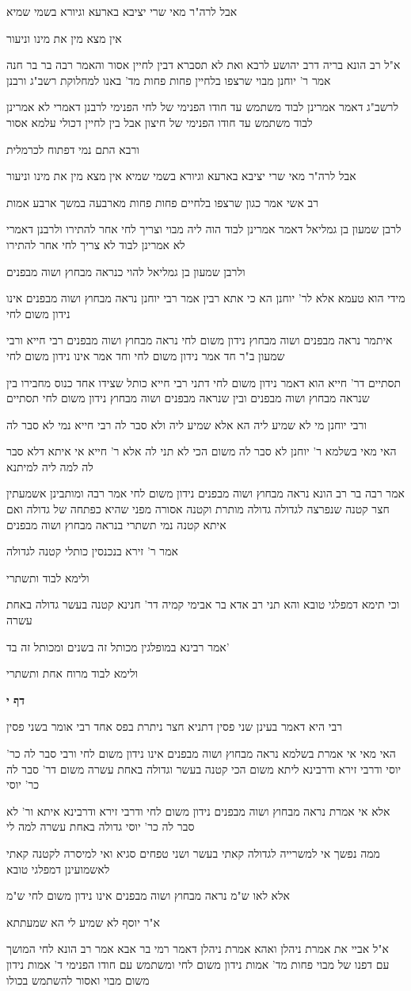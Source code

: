 \documentclass[12pt, openany]{book}
\newcommand{\sethebfont}{
\fontsize{10.5pt}{21.0pt} \selectfont
}
\newcommand{\textblock}[1]{
{\sethebfont #1\\}	
}
\newcommand{\sectname}{}
\newcommand{\newsection}[1]{
	\addcontentsline{toc}{section}{#1}
	\renewcommand{\sectname}{#1}	
	\vspace{-\baselineskip}
	\begin{center}
		\textbf{%
\fontsize{16pt}{16pt}\selectfont
			#1}
	\end{center}
	\vspace{-\baselineskip}
	\nopagebreak
}
\begin{document}
\textblock{אבל לרה"ר מאי שרי יציבא בארעא וגיורא בשמי שמיא}
\textblock{אין מצא מין את מינו וניעור}
\textblock{א"ל רב הונא בריה דרב יהושע לרבא ואת לא תסברא דבין לחיין אסור והאמר רבה בר בר חנה אמר ר' יוחנן מבוי שרצפו בלחיין פחות פחות מד'  באנו למחלוקת רשב"ג ורבנן}
\textblock{לרשב"ג דאמר אמרינן לבוד משתמש עד חודו הפנימי של לחי הפנימי לרבנן דאמרי לא אמרינן לבוד משתמש עד חודו הפנימי של חיצון אבל בין לחיין דכולי עלמא אסור}
\textblock{ורבא התם נמי דפתוח לכרמלית}
\textblock{אבל לרה"ר מאי שרי יציבא בארעא וגיורא בשמי שמיא אין מצא מין את מינו וניעור}
\textblock{רב אשי אמר כגון שרצפו בלחיים פחות פחות מארבעה במשך ארבע אמות}
\textblock{לרבן שמעון בן גמליאל דאמר אמרינן לבוד הוה ליה מבוי וצריך לחי אחר להתירו ולרבנן דאמרי לא אמרינן לבוד לא צריך לחי אחר להתירו}
\textblock{ולרבן שמעון בן גמליאל להוי כנראה מבחוץ ושוה מבפנים}
\textblock{מידי הוא טעמא אלא לר' יוחנן הא כי אתא רבין אמר רבי יוחנן נראה מבחוץ ושוה מבפנים אינו נידון משום לחי}
\textblock{איתמר נראה מבפנים ושוה מבחוץ נידון משום לחי נראה מבחוץ ושוה מבפנים רבי חייא ורבי שמעון ב"ר חד אמר נידון משום לחי וחד אמר אינו נידון משום לחי}
\textblock{תסתיים דר' חייא הוא דאמר נידון משום לחי דתני רבי חייא כותל שצידו אחד כנוס מחבירו בין שנראה מבחוץ ושוה מבפנים ובין שנראה מבפנים ושוה מבחוץ נידון משום לחי תסתיים}
\textblock{ורבי יוחנן מי לא שמיע ליה הא אלא שמיע ליה ולא סבר לה רבי חייא נמי לא סבר לה}
\textblock{האי מאי בשלמא ר' יוחנן לא סבר לה משום הכי לא תני לה אלא ר' חייא אי איתא דלא סבר לה למה ליה למיתנא}
\textblock{אמר רבה בר רב הונא נראה מבחוץ ושוה מבפנים נידון משום לחי אמר רבה ומותבינן אשמעתין חצר קטנה שנפרצה לגדולה גדולה מותרת וקטנה אסורה מפני שהיא כפתחה של גדולה ואם איתא קטנה נמי תשתרי בנראה מבחוץ ושוה מבפנים}
\textblock{אמר ר' זירא בנכנסין כותלי קטנה לגדולה}
\textblock{ולימא לבוד ותשתרי}
\textblock{וכי תימא דמפלגי טובא והא תני רב אדא בר אבימי קמיה דר' חנינא קטנה בעשר גדולה באחת עשרה}
\textblock{אמר רבינא במופלגין מכותל זה בשנים ומכותל זה בד'}
\textblock{ולימא לבוד מרוח אחת ותשתרי}
\newsection{דף י}
\textblock{רבי היא דאמר בעינן שני פסין דתניא חצר ניתרת בפס אחד רבי אומר בשני פסין}
\textblock{האי מאי אי אמרת בשלמא נראה מבחוץ ושוה מבפנים אינו נידון משום לחי ורבי סבר לה כר' יוסי ודרבי זירא ודרבינא ליתא משום הכי קטנה בעשר וגדולה באחת עשרה משום דר' סבר לה כר' יוסי}
\textblock{אלא אי אמרת נראה מבחוץ ושוה מבפנים נידון משום לחי ודרבי זירא ודרבינא איתא ור' לא סבר לה כר' יוסי גדולה באחת עשרה למה לי}
\textblock{ממה נפשך אי למשרייה לגדולה קאתי בעשר ושני טפחים סגיא ואי למיסרה לקטנה קאתי לאשמועינן דמפלגי טובא}
\textblock{אלא לאו ש"מ נראה מבחוץ ושוה מבפנים אינו נידון משום לחי ש"מ}
\textblock{א"ר יוסף לא שמיע לי הא שמעתתא}
\textblock{א"ל אביי את אמרת ניהלן ואהא אמרת ניהלן דאמר רמי בר אבא אמר רב הונא לחי המושך עם דפנו של מבוי פחות מד' אמות נידון משום לחי ומשתמש עם חודו הפנימי ד' אמות נידון משום מבוי ואסור להשתמש בכולו}
\end{document}

